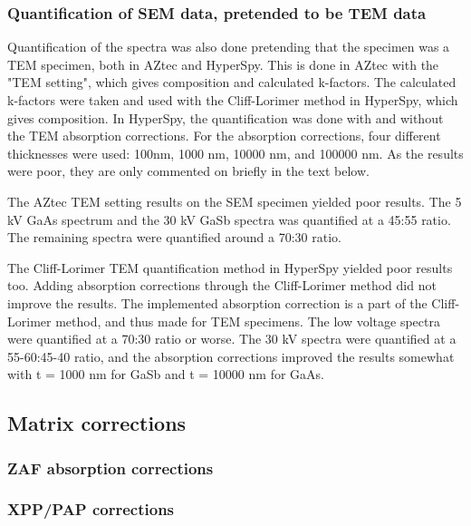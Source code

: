 


\subsubsection*{Quantification of SEM data, pretended to be TEM data}

Quantification of the spectra was also done pretending that the specimen was a TEM specimen, both in AZtec and HyperSpy.
This is done in AZtec with the "TEM setting", which gives composition and calculated k-factors.
The calculated k-factors were taken and used with the Cliff-Lorimer method in HyperSpy, which gives composition.
In HyperSpy, the quantification was done with and without the TEM absorption corrections.
For the absorption corrections, four different thicknesses were used: 100nm, 1000 nm, 10000 nm, and 100000 nm.
As the results were poor, they are only commented on briefly in the text below.

The AZtec TEM setting results on the SEM specimen yielded poor results.
The 5 kV GaAs spectrum and the 30 kV GaSb spectra was quantified at a 45:55 ratio.
The remaining spectra were quantified around a 70:30 ratio.


The Cliff-Lorimer TEM quantification method in HyperSpy yielded poor results too.
Adding absorption corrections through the Cliff-Lorimer method did not improve the results.
The implemented absorption correction is a part of the Cliff-Lorimer method, and thus made for TEM specimens.
The low voltage spectra were quantified at a 70:30 ratio or worse.
The 30 kV spectra were quantified at a 55-60:45-40 ratio, and the absorption corrections improved the results somewhat with t = 1000 nm for GaSb and t = 10000 nm for GaAs.




\subsection{Matrix corrections}
\label{results:matrix_corrections}



\subsubsection{ZAF absorption corrections}
\label{results:matrix_corrections:ZAF}



\subsubsection{XPP/PAP corrections}
\label{results:matrix_corrections:XPP}



% 
% 
